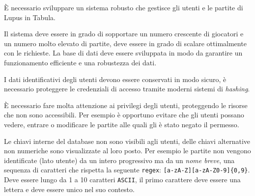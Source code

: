 È necessario sviluppare un sistema robusto che gestisce gli utenti e le partite di Lupus in Tabula.

Il sistema deve essere in grado di sopportare un numero crescente di giocatori e un numero molto elevato di partite, deve essere in grado di scalare ottimalmente con le richieste. La base di dati deve essere sviluppata in modo da garantire un funzionamento efficiente e una robustezza dei dati.

I dati identificativi degli utenti devono essere conservati in modo sicuro, è necessario proteggere le credenziali di accesso tramite moderni sistemi di \emph{hashing}.

È necessario fare molta attenzione ai privilegi degli utenti, proteggendo le risorse che non sono accessibili. Per esempio è opportuno evitare che gli utenti possano vedere, entrare o modificare le partite alle quali gli è stato negato il permesso.

Le chiavi interne del database non sono visibili agli utenti, delle chiavi alternative non numeriche sono visualizzate al loro posto. Per esempio le partite non vengono identificate (lato utente) da un intero progressivo ma da un \emph{nome breve}, una sequenza di caratteri che rispetta la seguente \texttt{regex}: \texttt{[a-zA-Z][a-zA-Z0-9]\{0,9\}}. Deve essere lungo da 1 a 10 caratteri \texttt{ASCII}, il primo carattere deve essere una lettera e deve essere unico nel suo contesto.